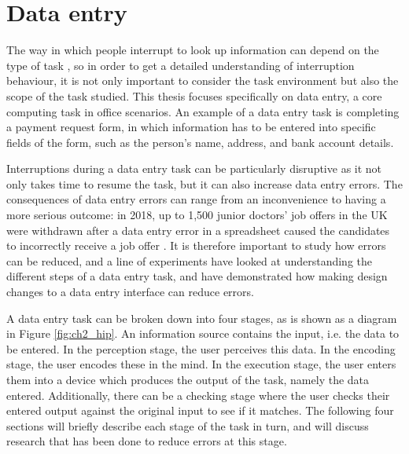 \section{Data entry}
The way in which people interrupt to look up information can depend on the type of task \citep{Bondarenko2005}, so in order to get a detailed understanding of interruption behaviour, it is not only important to consider the task environment but also the scope of the task studied. This thesis focuses specifically on data entry, a core computing task in office scenarios. An example of a data entry task is completing a payment request form, in which information has to be entered into specific fields of the form, such as the person's name, address, and bank account details. 

Interruptions during a data entry task can be particularly disruptive as it not only takes time to resume the task, but it can also increase data entry errors. The consequences of data entry errors can range from an inconvenience to having a more serious outcome: in 2018, up to 1,500 junior doctors' job offers in the UK were withdrawn after a data entry error in a spreadsheet caused the candidates to incorrectly receive a job offer \citep{BBC2018}. It is therefore important to study how errors can be reduced, and a line of experiments have looked at understanding the different steps of a data entry task, and have demonstrated how making design changes to a data entry interface can reduce errors. 
 

A data entry task can be broken down into four stages, as is shown as a diagram in Figure \ref{fig:ch2_hip}. An information source contains the input, i.e. the data to be entered. In the perception stage, the user perceives this data. In the encoding stage, the user encodes these in the mind. In the execution stage, the user enters them into a device which produces the output of the task, namely the data entered. Additionally, there can be a checking stage where the user checks their entered output against the original input to see if it matches. The following four sections will briefly describe each stage of the task in turn, and will discuss research that has been done to reduce errors at this stage. 


